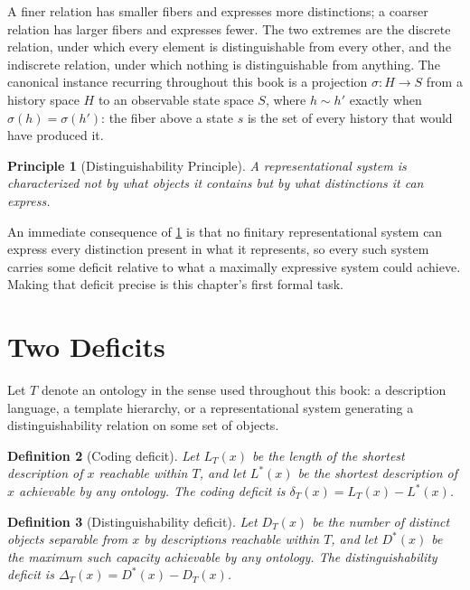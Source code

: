 \documentclass[12pt]{report}
\newtheorem{definition}{Definition}[section]
\newtheorem{principle}[definition]{Principle}
\newcommand{\Dstar}{\ensuremath{D^{*}}}
\newcommand{\DT}{\ensuremath{D_T}}
\newcommand{\Lreach}{\ensuremath{L_T}}
\newcommand{\Lopt}{\ensuremath{L^{*}}}
\begin{document}
A finer relation has smaller fibers and expresses more distinctions; a
coarser relation has larger fibers and expresses fewer. The two extremes
are the discrete relation, under which every element is distinguishable
from every other, and the indiscrete relation, under which nothing is
distinguishable from anything. The canonical instance recurring
throughout this book is a projection $\sigma : H \to S$ from a history
space $H$ to an observable state space $S$, where $h \sim h'$ exactly
when $\sigma(h) = \sigma(h')$: the fiber above a state $s$ is the set of
every history that would have produced it.

\begin{principle}[Distinguishability Principle]
\label{prin:dist}
A representational system is characterized not by what objects it
contains but by what distinctions it can express.
\end{principle}

An immediate consequence of \cref{prin:dist} is that no finitary
representational system can express every distinction present in what it
represents, so every such system carries some deficit relative to what a
maximally expressive system could achieve. Making that deficit precise is
this chapter's first formal task.

\section{Two Deficits}
\label{sec:deficits}

Let $T$ denote an ontology in the sense used throughout this book: a
description language, a template hierarchy, or a representational system
generating a distinguishability relation on some set of objects.

\begin{definition}[Coding deficit]
\label{def:coding-deficit}
Let $\Lreach(x)$ be the length of the shortest description of $x$
reachable within $T$, and let $\Lopt(x)$ be the shortest description of
$x$ achievable by any ontology. The \emph{coding deficit} is
$\delta_T(x) = \Lreach(x) - \Lopt(x)$.
\end{definition}

\begin{definition}[Distinguishability deficit]
\label{def:dist-deficit}
Let $\DT(x)$ be the number of distinct objects separable from $x$ by
descriptions reachable within $T$, and let $\Dstar(x)$ be the maximum
such capacity achievable by any ontology. The \emph{distinguishability
deficit} is $\Delta_T(x) = \Dstar(x) - \DT(x)$.
\end{definition}
\end{document}
